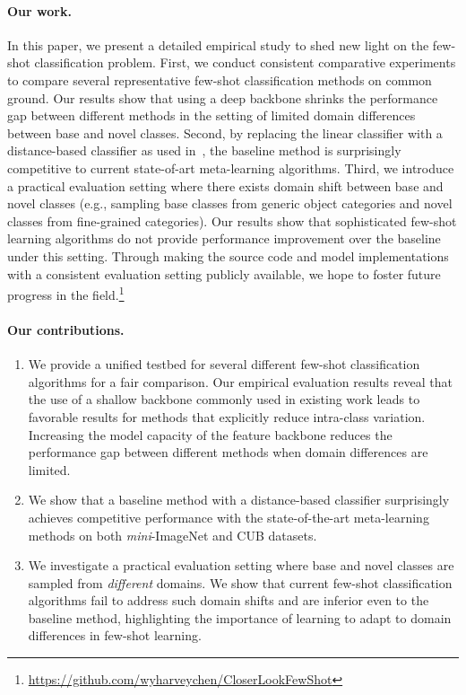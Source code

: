 \documentclass{article}
\newlength\paramargin
\def \miniI {\emph{mini}-ImageNet }
\begin{document}
\paragraph{Our work.} In this paper, we present a detailed empirical study to shed new light on the few-shot classification problem. First, we conduct consistent comparative experiments to compare several representative few-shot classification methods on common ground. Our results show that using a deep backbone shrinks the performance gap between different methods in the setting of limited domain differences between base and novel classes. Second, by replacing the linear classifier with a distance-based classifier as used in~\cite{gidaris2018dynamic,qi2018low}, the baseline method is surprisingly competitive to current state-of-art meta-learning algorithms. Third, we introduce a practical evaluation setting where there exists domain shift between base and novel classes (e.g., sampling base classes from generic object categories and novel classes from fine-grained categories). Our results show that sophisticated few-shot learning algorithms do not provide performance improvement over the baseline under this setting. Through making the source code and model implementations with a consistent evaluation setting publicly available, we hope to foster future progress in the field.\footnote{\url{https://github.com/wyharveychen/CloserLookFewShot}}



\vspace{\paramargin}
\paragraph{Our contributions.}
\begin{enumerate}[leftmargin=*]
\item We provide a unified testbed for several different few-shot classification algorithms for a fair comparison. Our empirical evaluation results reveal that the use of a shallow backbone commonly used in existing work leads to favorable results for methods that explicitly reduce intra-class variation. Increasing the model capacity of the feature backbone reduces the performance gap between different methods when domain differences are limited.
\item We show that a baseline method with a distance-based classifier surprisingly achieves competitive performance with the state-of-the-art meta-learning methods on both \miniI and CUB datasets.
\item We investigate a practical evaluation setting where base and novel classes are sampled from \emph{different} domains. We show that current few-shot classification algorithms fail to address such domain shifts and are inferior even to the baseline method, highlighting the importance of learning to adapt to domain differences in few-shot learning.
\end{enumerate}
\end{document}
